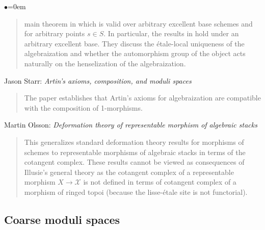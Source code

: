 \begin{list}{$\bullet$}{\leftmargin=0em}
\begin{quote}
main theorem in \cite{artin_algebraizationI} which is valid over arbitrary
excellent base schemes and for arbitrary points $s \in S$. 
In particular, the results in \cite{artin_versal} hold under an arbitrary 
excellent base. They discuss the \'etale-local uniqueness of the 
algebraization and whether the automorphism group of the object acts naturally 
on the henselization of the algebraization.
\end{quote}
\smallskip
\item Jason Starr: \emph{Artin's axioms, composition, and moduli spaces}
\cite{starr_artin}
\begin{quote}
The paper establishes that Artin's axioms for algebraization are compatible 
with the composition of 1-morphisms.
\end{quote}
\smallskip
\item Martin Olsson: \emph{Deformation theory of representable 
morphism of algebraic stacks} \cite{olsson_deformation}
\begin{quote}
This generalizes standard deformation theory results for morphisms of schemes 
to representable morphisms of algebraic stacks in terms of the cotangent 
complex. These results cannot be viewed as consequences of Illusie's general 
theory as the cotangent complex of a representable morphism $X \to \mathcal{X}$ 
is not 
defined in terms of cotangent complex of a morphism of ringed topoi (because 
the lisse-\'etale site is not functorial).
\end{quote}
\end{list}

\subsection{Coarse moduli spaces}
\label{subsection-coarse-moduli-spaces}


